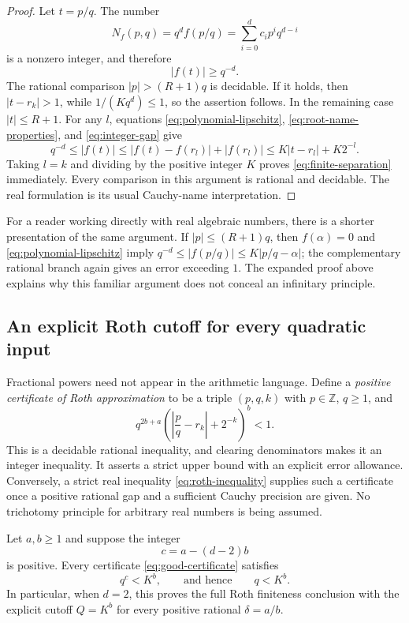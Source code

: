 \begin{proof}
Let $t=p/q$.  The number
\[
 N_f(p,q)=q^df(p/q)=\sum_{i=0}^{d}c_i p^i q^{d-i}
\]
is a nonzero integer, and therefore
\begin{equation}\label{eq:integer-gap}
 |f(t)|\geq q^{-d}.
\end{equation}
The rational comparison $|p|>(R+1)q$ is decidable.  If it holds, then
$|t-r_k|>1$, while $1/(Kq^d)\leq1$, so the assertion follows.
In the remaining case $|t|\leq R+1$.  For any $l$, equations
\eqref{eq:polynomial-lipschitz}, \eqref{eq:root-name-properties}, and
\eqref{eq:integer-gap} give
\[
 q^{-d}\leq|f(t)|
 \leq |f(t)-f(r_l)|+|f(r_l)|
 \leq K|t-r_l|+K2^{-l}.
\]
Taking $l=k$ and dividing by the positive integer $K$ proves
\eqref{eq:finite-separation} immediately.  Every comparison in this
argument is rational and decidable.
The real formulation is its usual Cauchy-name interpretation.
\end{proof}

For a reader working directly with real algebraic numbers, there is a shorter
presentation of the same argument.  If $|p|\leq(R+1)q$, then $f(\alpha)=0$
and \eqref{eq:polynomial-lipschitz} imply
$q^{-d}\leq|f(p/q)|\leq K|p/q-\alpha|$; the complementary rational branch
again gives an error exceeding $1$.  The expanded proof above explains why
this familiar argument does not conceal an infinitary principle.

\subsection{An explicit Roth cutoff for every quadratic input}

Fractional powers need not appear in the arithmetic language.  Define a
\emph{positive certificate of Roth approximation} to be a triple $(p,q,k)$
with $p\in\mathbb Z$, $q\geq1$, and
\begin{equation}\label{eq:good-certificate}
 q^{2b+a}\left(\left|\frac pq-r_k\right|+2^{-k}\right)^b<1.
\end{equation}
This is a decidable rational inequality, and clearing denominators makes it
an integer inequality.  It asserts a strict upper bound with an explicit
error allowance.  Conversely, a strict real inequality
\eqref{eq:roth-inequality} supplies such a certificate once a positive
rational gap and a sufficient Cauchy precision are given.  No trichotomy
principle for arbitrary real numbers is being assumed.

\begin{theorem}
\label{thm:quadratic-roth}
Let $a,b\geq1$ and suppose the integer
\[
 c=a-(d-2)b
\]
is positive.  Every certificate \eqref{eq:good-certificate} satisfies
\begin{equation}\label{eq:cutoff-explicit}
 q^c<K^b,\qquad\text{and hence}\qquad q<K^b.
\end{equation}
In particular, when $d=2$, this proves the full Roth finiteness conclusion
with the explicit cutoff $Q=K^b$ for every positive rational $\delta=a/b$.
\end{theorem}

